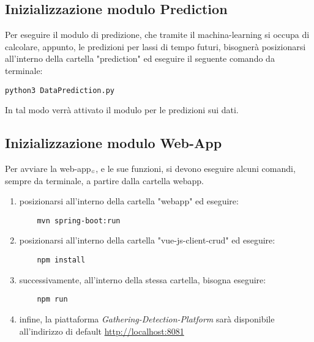 

\subsection{Inizializzazione modulo Prediction}\label{RequisitiDiSistemaEdInstallazioneInstallazioneInizializzazioneModuloPrediction}
Per eseguire il modulo di predizione, che tramite il machina-learning si occupa di calcolare, appunto, le predizioni per lassi di tempo futuri, bisognerà posizionarsi all'interno della cartella "prediction" ed eseguire il seguente comando da terminale:

\begin{lstlisting}
python3 DataPrediction.py
\end{lstlisting}
In tal modo verrà attivato il modulo per le predizioni sui dati.


\subsection{Inizializzazione modulo Web-App}\label{RequisitiDiSistemaEdInstallazioneInstallazioneInizializzazioneModuloWebApp}
Per avviare la web-app$_{\scaleto{G}{3pt}}$, e le sue funzioni, si devono eseguire alcuni comandi, sempre da terminale, a partire dalla cartella webapp.
\begin{enumerate}
	\item posizionarsi all'interno della cartella "webapp" ed eseguire:
	\begin{lstlisting}
	mvn spring-boot:run
	\end{lstlisting}
	\item posizionarsi all'interno della cartella "vue-js-client-crud" ed eseguire:
	\begin{lstlisting}
	npm install
	\end{lstlisting}
	\item successivamente, all'interno della stessa cartella, bisogna eseguire:
	\begin{lstlisting}
	npm run
	\end{lstlisting}
	\item infine, la piattaforma \textit{Gathering-Detection-Platform} sarà disponibile all'indirizzo di default \url{http://localhost:8081} 
\end{enumerate}
